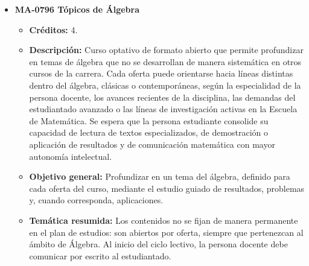 \begin{itemize}[leftmargin=1.3em, itemsep=10pt, topsep=4pt, label={\color{Azul-UCR}$\blacksquare$}]
\item {\color{Azul-UCR}\textbf{MA-0796 Tópicos de Álgebra}}\par\nopagebreak\smallskip
\begin{itemize}[leftmargin=1.1em, itemsep=3pt, topsep=2pt, parsep=2pt, label={\textendash}]
\item \textbf{Créditos:} 4.
\item \textbf{Descripción:} Curso optativo de formato abierto que permite profundizar en temas de álgebra que no se desarrollan de manera sistemática en otros cursos de la carrera. Cada oferta puede orientarse hacia líneas distintas dentro del álgebra, clásicas o contemporáneas, según la especialidad de la persona docente, los avances recientes de la disciplina, las demandas del estudiantado avanzado o las líneas de investigación activas en la Escuela de Matemática. Se espera que la persona estudiante consolide su capacidad de lectura de textos especializados, de demostración o aplicación de resultados y de comunicación matemática con mayor autonomía intelectual.
\item \textbf{Objetivo general:} Profundizar en un tema del álgebra, definido para cada oferta del curso, mediante el estudio guiado de resultados, problemas y, cuando corresponda, aplicaciones.
\item \textbf{Temática resumida:} Los contenidos no se fijan de manera permanente en el plan de estudios: son abiertos por oferta, siempre que pertenezcan al ámbito de Álgebra. Al inicio del ciclo lectivo, la persona docente debe comunicar por escrito al estudiantado.
\end{itemize}


\end{itemize}
